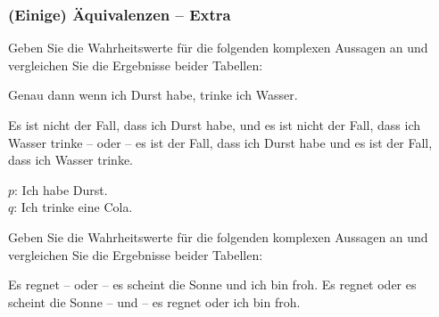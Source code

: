 \begin{frame}
\frametitle{(Einige) Äquivalenzen -- Extra}

Geben Sie die Wahrheitswerte für die folgenden komplexen Aussagen an und vergleichen Sie die Ergebnisse beider Tabellen:

	\ea Genau dann wenn ich Durst habe, trinke ich Wasser.

	\ex Es ist nicht der Fall, dass ich Durst habe, und es ist nicht der Fall, dass ich Wasser trinke -- oder -- es ist der Fall, dass ich Durst habe und es ist der Fall, dass ich Wasser trinke.
	\z 

\pause 

{\small $p$: Ich habe Durst.\\
$q$: Ich trinke eine Cola.}

\pause 

\begin{minipage}{0.35\textwidth}
	\centering

\end{minipage}
\pause
\begin{minipage}{0.55\textwidth}
	\centering

\end{minipage}



\end{frame}


\begin{frame}

Geben Sie die Wahrheitswerte für die folgenden komplexen Aussagen an und vergleichen Sie die Ergebnisse beider Tabellen:

	
	\ea Es regnet -- oder -- es scheint die Sonne und ich bin froh.
	\ex Es regnet oder es scheint die Sonne -- und -- es regnet oder ich bin froh.
	\z 
	 	
\end{frame}


